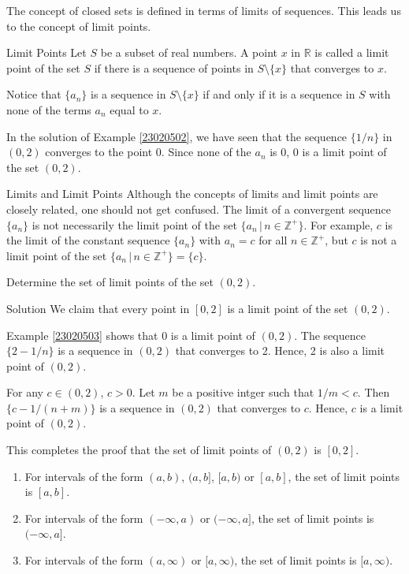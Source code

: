 The concept of closed sets is defined in terms of limits of sequences. This leads us to the concept of limit points.
\begin{definition}{Limit Points}
Let $S$ be a subset of real numbers. A point $x$ in $\mathbb{R}$ is called a limit point of the set $S$ if there is a sequence of points in $S\setminus \{x\}$ that converges to $x$.
\end{definition}
 
Notice that  $\{a_n\}$ is a sequence in $S\setminus\{x\}$ if and only if it is a sequence in $S$ with none of the terms $a_n$  equal to $x$. 
\begin{example}[label=23020503]{}
In the solution of Example \ref{23020502}, we have seen that the sequence $\{1/n\}$ in $(0,2)$  converges to the point $0$. Since none of the $a_n$ is 0,  0 is a limit point of the set $(0,2)$. 
\end{example}
\begin{highlight}{Limits and Limit Points}
Although the concepts of limits and limit points are closely related, one should not get confused. The limit of a convergent sequence $\{a_n\}$ is not necessarily the limit point of the set $\{a_n\,|\,n\in\mathbb{Z}^+\}$. For example, $c$ is the limit of the constant sequence $\{a_n\}$ with $a_n=c$ for all $n\in\mathbb{Z}^+$, but $c$ is not a limit point of the set $\{a_n\,|\,n\in\mathbb{Z}^+\}=\{c\}$.\end{highlight}

\begin{example}{}
Determine the set of limit  points of the set $(0,2)$.
\end{example}
\begin{solution}{Solution}
We claim that every point in $[0,2]$ is a limit point of the  set $(0,2)$. 

Example \ref{23020503} shows that 0 is a limit point of $(0,2)$. The sequence
$\{2-1/n\}$ is a sequence in $(0,2)$ that converges to 2. Hence, 2 is also a limit point of $(0,2)$.

For any $c\in (0,2)$, $c>0$. Let $m$ be a positive intger such that $1/m<c$. Then $\{c-1/(n+m)\}$ is  a sequence in $(0,2)$ that converges to $c$. Hence,  $c$ is a limit point of $(0,2)$.

This completes the proof that the set of limit points of $(0,2)$  is $[0,2]$.
\end{solution}

\begin{remark}{}
\begin{enumerate}[1.]
\item For intervals of the form $(a,b)$, $(a, b]$, $[a, b)$ or $[a,b]$, the set of limit points is $[a,b]$.
\item For intervals of the form $(-\infty, a)$ or $(-\infty, a]$, the set of limit points is $(-\infty, a]$.
\item For intervals of the form $(a, \infty)$ or $[a, \infty)$, the set of limit points is $[a, \infty)$.
\end{enumerate}

\end{remark}



